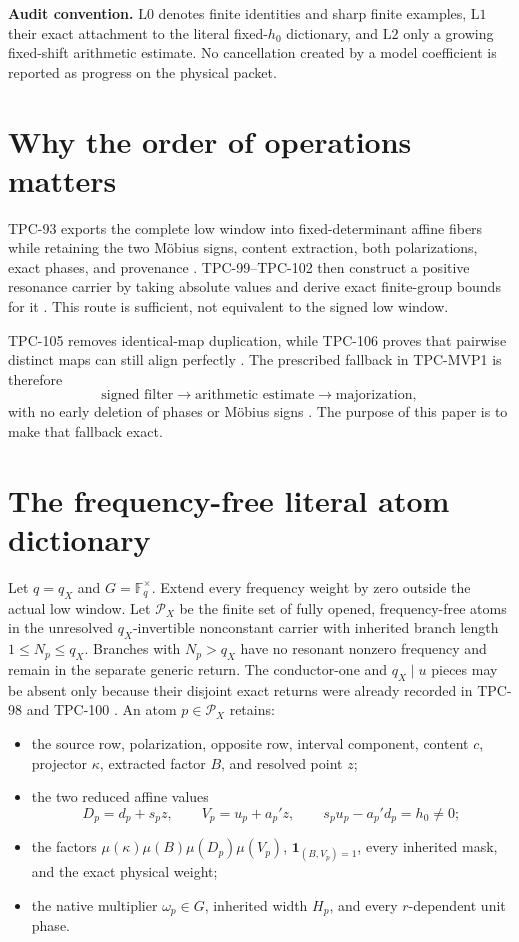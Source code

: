\documentclass[11pt]{article}
\theoremstyle{remark}
\newcommand{\F}{\mathbb F}
\newcommand{\one}{\mathbf 1}
\newcommand{\Lzero}{\mathrm{L0}}
\newcommand{\Lone}{\mathrm{L1}}
\newcommand{\Ltwo}{\mathrm{L2}}
\begin{document}
\medskip
\noindent\textbf{Audit convention.}
\(\Lzero\) denotes finite identities and sharp finite examples,
\(\Lone\) their exact attachment to the literal fixed-\(h_0\)
dictionary, and \(\Ltwo\) only a growing fixed-shift arithmetic
estimate.  No cancellation created by a model coefficient is
reported as progress on the physical packet.

\section{Why the order of operations matters}

TPC-93 exports the complete low window into fixed-determinant affine
fibers while retaining the two M\"obius signs, content extraction,
both polarizations, exact phases, and provenance
\citep{WangTPC93}.  TPC-99--TPC-102 then construct a positive
resonance carrier by taking absolute values and derive exact
finite-group bounds for it \citep{WangTPC99,WangTPC102}.  This route
is sufficient, not equivalent to the signed low window.

TPC-105 removes identical-map duplication, while TPC-106 proves
that pairwise distinct maps can still align perfectly
\citep{WangTPC105,WangTPC106}.  The prescribed fallback in
TPC-MVP1 is therefore
\[
 \text{signed filter}
 \longrightarrow
 \text{arithmetic estimate}
 \longrightarrow
 \text{majorization},
\]
with no early deletion of phases or M\"obius signs
\citep{WangTPCMVP1}.  The purpose of this paper is to make that
fallback exact.

\section{The frequency-free literal atom dictionary}

Let \(q=q_X\) and \(G=\F_q^\times\).  Extend every frequency weight
by zero outside the actual low window.  Let \(\mathcal P_X\) be the
finite set of fully opened, frequency-free atoms in the unresolved
\(q_X\)-invertible nonconstant carrier with inherited branch length
\(1\le N_p\le q_X\).  Branches with \(N_p>q_X\) have no resonant
nonzero frequency and remain in the separate generic return.  The
conductor-one and
\(q_X\mid u\) pieces may be absent only because their disjoint exact
returns were already recorded in TPC-98 and TPC-100
\citep{WangTPC102}.  An atom
\(p\in\mathcal P_X\) retains:
\begin{itemize}[leftmargin=2em]
\item the source row, polarization, opposite row, interval
component, content \(c\), projector \(\kappa\), extracted factor
\(B\), and resolved point \(z\);
\item the two reduced affine values
\[
 D_p=d_p+s_pz,\qquad V_p=u_p+a_p'z,
 \qquad s_pu_p-a_p'd_p=h_0\ne0;
\]
\item the factors
\(\mu(\kappa)\mu(B)\mu(D_p)\mu(V_p)\),
\(\one_{(B,V_p)=1}\), every inherited mask, and the exact physical
weight;
\item the native multiplier
\(\omega_p\in G\), inherited width \(H_p\), and every
\(r\)-dependent unit phase.
\end{itemize}
\end{document}
